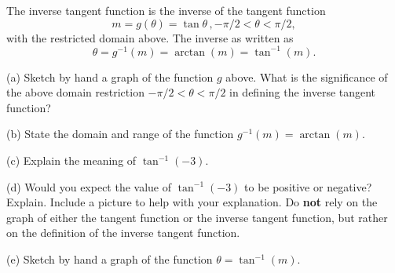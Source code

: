\documentclass{ximera}
\begin{document}
The inverse tangent function is the inverse of the tangent function
\[
   m = g(\theta) = \tan \theta \, , -\pi/2 < \theta < \pi/2 ,
\]
with the restricted domain above. The inverse as written as
\[
    \theta = g^{-1}(m) = \arctan (m) = \tan^{-1}(m) .
\]

\begin{question} \label{Q12:InverseTrig}

(a) Sketch by hand a graph of the function $g$ above. What is the significance of the above domain restriction $-\pi/2 < \theta < \pi/2$  in defining the inverse tangent function?

(b) State the domain and range of the function $g^{-1}(m) = \arctan (m)$.

(c) Explain the meaning of $\tan^{-1}(-3)$.

(d) Would you expect the value of $\tan^{-1}(-3)$ to be positive or negative? Explain. Include a picture to help with your explanation. Do {\bf not} rely on the graph of either the tangent function or the inverse tangent function, but rather on the definition of the inverse tangent function. 

(e) Sketch by hand a graph of the function $\theta =  \tan^{-1}(m) $.

\end{question}
\end{document}
